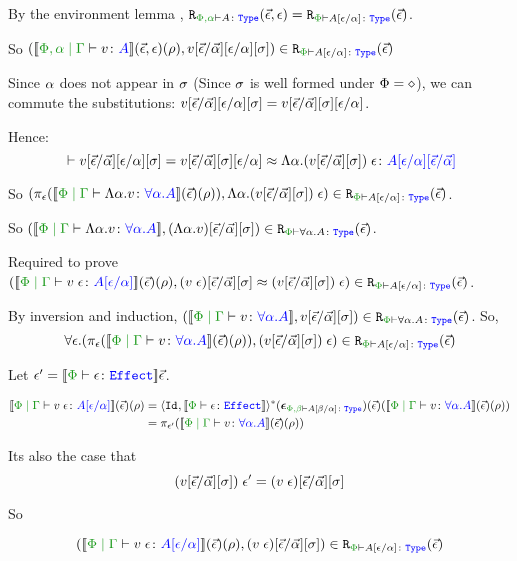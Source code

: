 \documentclass{Report}
\begin{document}
By the environment lemma , $\erelates{\P, \a}{A}(\ev, \e) = \erelates{\P}{A\ssub{\a}{\e}}(\ev)$.


So $\inLogRelPE{\deno{\etyperelation{\P,\a}{\G}{v}{A}}(\ev, \e)(\rho)}{v\ssub{\av}{\ev}\ssub{\a}{\e}\ssi}{A\ssub{\a}{\e}}$

Since $\alpha$ does not appear in $\sigma$ (Since $\sigma$ is well formed under $\Phi = \diamond$), we can commute the substitutions: $v[\vec{\epsilon} / \vec{\alpha}][\epsilon / \alpha][\sigma] = v[\vec{\epsilon} / \vec{\alpha}][\sigma][\epsilon / \alpha]$.

Hence: 
\begin{equation*}
    \zberelation{v\ssub{\av}{\ev}\ssub{\a}{\e}\ssi = v\ssub{\av}{\ev}\ssi\ssub{\a}{\e}}{\eapp{\elam{\a}{(v\fundSub)}}{\e}}{A\ssub{\a}{\e}\ssub{\av}{\ev}}
\end{equation*}

So $\inLogRelPE{    \pe(\deno{\gpetyperelation{\elam{\a}{v}}{\all{\a}{A}}}\fundRho)}{\eapp{\elam{\a}{(v\fundSub)}}{\e}}{A\ssub{\a}{\e}}$.

So $\inLogRelPE{\deno{\gpetyperelation{\elam{\a}{v}}{\all{\a}{A}}}}{(\elam{\a}{v})\fundSub}{\all{\a}{A}}$.


\case{\vspec}
Required to prove $\inLogRelPE{\deno{\gpetyperelation{\eapp{v}{\e}}{A\ssub{\a}{\e}}}\fundRho}{(\eapp{v}{\e})\fundSub\beequiv\eapp{(v\fundSub)}{\e}}{A\ssub{\a}{\e}}$.

By inversion and induction, $\inLogRelPE{\deno{\gpetyperelation{v}{\all{\a}{A}}}}{v\fundSub}{\all{\a}{A}}$. So, $$\forall\e. \inLogRelPE{\pe(\deno{\gpetyperelation{v}{\all{\a}{A}}}\fundRho)}{\eapp{(v\fundSub)}{\e}}{A\ssub{\a}{\e}}$$

Let $\e' = \deno{\wellformede{\P}{\e}}\ev$.

\begin{align*}
    \deno{\gpetyperelation{\eapp{v}{\e}}{A\ssub{\a}{\e}}}\fundRho 
    & = \pr{\Id{}}{\deno{\wellformede{\P}{\e}}}\star(\counit{\wellformedt{\P,\b}{A\ssub{\a}{\b}}})(\ev)(\deno{\gpetyperelation{v}{\all{\a}{A}}}\fundRho)\\
    & = \pi_{\e'}(\deno{\gpetyperelation{v}{\all{\a}{A}}}\fundRho)
\end{align*}

Its also the case that
\begin{equation}
    (v[\vec{\epsilon} / \vec{\alpha}][\sigma])\;\epsilon' = (v\;\epsilon)[\vec{\epsilon} / \vec{\alpha}][\sigma]
\end{equation}

So

\begin{equation}
    \inLogRelPE{\deno{\gpetyperelation{\eapp{v}{\e}}{A\ssub{\a}{\e}}}\fundRho }{(\eapp{v}{\e})\fundSub}{A\ssub{\a}{\e}}
\end{equation}
\end{document}
